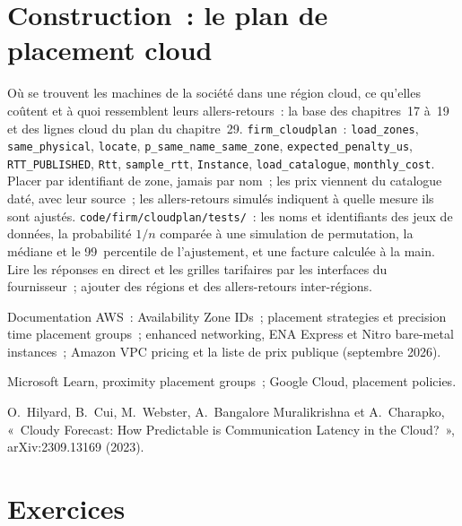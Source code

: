 \section{Construction~: le plan de placement cloud}\label{bld:nw:trading-in-a-public-cloud:cloudplan}

\begin{build}
 Où se trouvent les machines de la société dans une région cloud, ce qu'elles coûtent et à quoi ressemblent leurs allers-retours~: la base des chapitres~17 à~19
et des lignes cloud du plan du chapitre~29.
 \texttt{firm\_cloudplan}~: \texttt{load\_zones}, \texttt{same\_physical}, \texttt{locate}, \texttt{p\_same\_name\_same\_zone},
\texttt{expected\_penalty\_us}, \texttt{RTT\_PUBLISHED}, \texttt{Rtt}, \texttt{sample\_rtt}, \texttt{Instance}, \texttt{load\_catalogue},
\texttt{monthly\_cost}.
 Placer par identifiant de zone, jamais par nom~; les prix viennent du catalogue daté, avec leur source~; les allers-retours simulés indiquent
à quelle mesure ils sont ajustés.
 \texttt{code/firm/cloudplan/tests/}~: les noms et identifiants des jeux de données, la probabilité $1/n$ comparée à une
simulation de permutation, la médiane et le 99~percentile de l'ajustement, et une facture calculée à la main.
 Lire les réponses en direct et les grilles tarifaires par les interfaces du fournisseur~; ajouter des régions et des allers-retours inter-régions.
\end{build}

\begin{omsources}
\item Documentation AWS~: Availability Zone IDs~; placement strategies et precision time placement groups~; enhanced networking, ENA Express et
Nitro bare-metal instances~; Amazon VPC pricing et la liste de prix publique (septembre 2026).
\item Microsoft Learn, proximity placement groups~; Google Cloud, placement policies.
\item O.~Hilyard, B.~Cui, M.~Webster, A.~Bangalore Muralikrishna et A.~Charapko, «~Cloudy Forecast: How Predictable is Communication Latency in the
Cloud?~», arXiv:2309.13169 (2023).
\end{omsources}

\section{Exercices}

